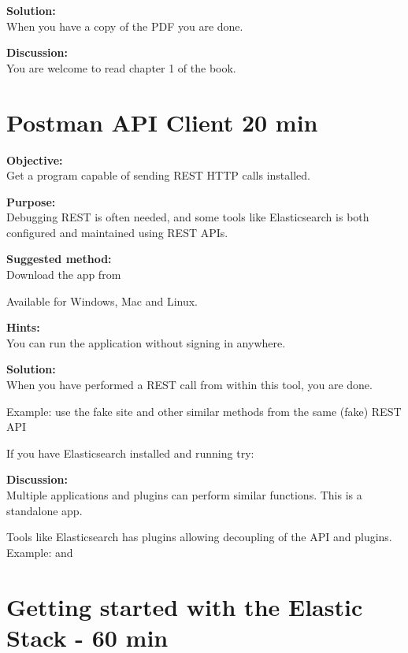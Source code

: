 \documentclass[a4paper,11pt,notitlepage]{report}
\begin{document}
{\bf Solution:}\\
When you have a copy of the PDF you are done.

{\bf Discussion:}\\
You are welcome to read chapter 1 of the book.




\chapter{Postman API Client 20 min}
\label{ex:postman-api}


{\bf Objective:}\\
Get a program capable of sending REST HTTP calls installed.


{\bf Purpose:}\\
Debugging REST is often needed, and some tools like Elasticsearch is both configured and maintained using REST APIs.

{\bf Suggested method:}\\
Download the app from

Available for Windows, Mac and Linux.

{\bf Hints:}\\
You can run the application without signing in anywhere.

{\bf Solution:}\\
When you have performed a REST call from within this tool, you are done.

Example: use the fake site  and other similar methods from the same (fake) REST API

If you have Elasticsearch installed and running try: 

{\bf Discussion:}\\
Multiple applications and plugins can perform similar functions. This is a standalone app.

Tools like Elasticsearch has plugins allowing decoupling of the API and plugins. Example:  and 





\chapter{Getting started with the Elastic Stack - 60 min}
\label{ex:dateformats}
\end{document}
